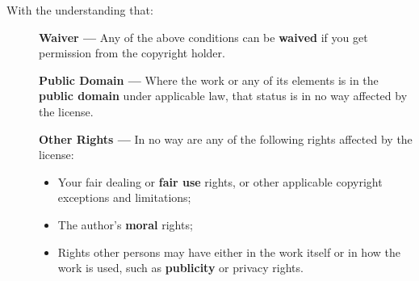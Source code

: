 \documentclass[12pt]{book}
\begin{document}
\vspace{.5cm}
\noindent
With the understanding that:
\begin{description}
\item[] \textbf{Waiver —} Any of the above conditions can be \textbf{waived} if you get permission from the copyright holder.

\item[] \textbf{Public Domain —} Where the work or any of its elements is in the \textbf{public domain} under applicable law, that status is in no way affected by the license.

\item[] \textbf{Other Rights —} In no way are any of the following rights affected by the license:
\begin{itemize}
\item Your fair dealing or \textbf{fair use} rights, or other applicable copyright exceptions and limitations;
\item The author's \textbf{moral} rights;
\item Rights other persons may have either in the work itself or in how the work is used, such as \textbf{publicity} or privacy rights.
\end{itemize}
\end{description}
\normalsize
\ifx\wholebook\relax\else
% 
% 
	
\end{document}
